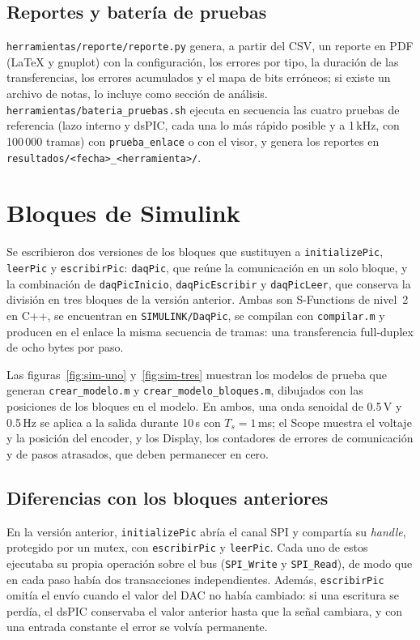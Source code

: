 \documentclass[11pt]{article}
\newcommand{\code}[1]{\texttt{#1}}
\begin{document}
\subsection{Reportes y batería de pruebas}

\code{herramientas/reporte/reporte.py} genera, a partir del CSV, un reporte
en PDF (LaTeX y gnuplot) con la configuración, los errores por tipo, la
duración de las transferencias, los errores acumulados y el mapa de bits
erróneos; si existe un archivo de notas, lo incluye como sección de
análisis. \code{herramientas/bateria\_pruebas.sh} ejecuta en secuencia las
cuatro pruebas de referencia (lazo interno y dsPIC, cada una lo más rápido
posible y a 1\,kHz, con 100\,000 tramas) con \code{prueba\_enlace} o con el
visor, y genera los reportes en \code{resultados/<fecha>\_<herramienta>/}.

\section{Bloques de Simulink}
\label{sec:simulink}

Se escribieron dos versiones de los bloques que sustituyen a
\code{initializePic}, \code{leerPic} y \code{escribirPic}: \code{daqPic},
que reúne la comunicación en un solo bloque, y la combinación de
\code{daqPicInicio}, \code{daqPicEscribir} y \code{daqPicLeer}, que conserva
la división en tres bloques de la versión anterior. Ambas son S-Functions de
nivel~2 en C++, se encuentran en \code{SIMULINK/DaqPic}, se compilan con
\code{compilar.m} y producen en el enlace la misma secuencia de tramas: una
transferencia full-duplex de ocho bytes por paso.

Las figuras~\ref{fig:sim-uno} y~\ref{fig:sim-tres} muestran los modelos de
prueba que generan \code{crear\_modelo.m} y \code{crear\_modelo\_bloques.m},
dibujados con las posiciones de los bloques en el modelo. En ambos, una onda
senoidal de 0.5\,V y 0.5\,Hz se aplica a la salida durante 10\,s con
$T_s = 1$\,ms; el Scope muestra el voltaje y la posición del encoder, y los
Display, los contadores de errores de comunicación y de pasos atrasados, que
deben permanecer en cero.

\subsection{Diferencias con los bloques anteriores}

En la versión anterior, \code{initializePic} abría el canal SPI y compartía
su \emph{handle}, protegido por un mutex, con \code{escribirPic} y
\code{leerPic}. Cada uno de estos ejecutaba su propia operación sobre el bus
(\code{SPI\_Write} y \code{SPI\_Read}), de modo que en cada paso había dos
transacciones independientes. Además, \code{escribirPic} omitía el envío
cuando el valor del DAC no había cambiado: si una escritura se perdía, el
dsPIC conservaba el valor anterior hasta que la señal cambiara, y con una
entrada constante el error se volvía permanente.
\end{document}
